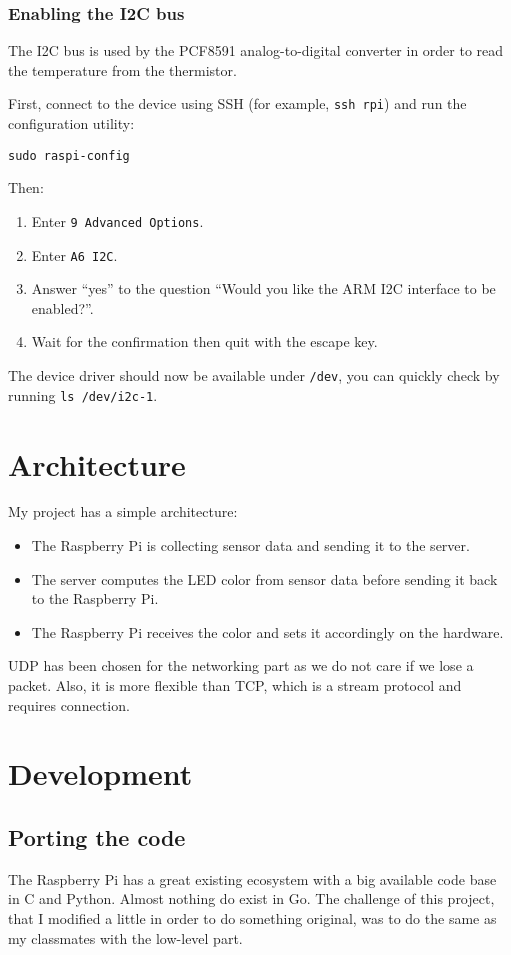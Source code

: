 \documentclass[11pt,a4paper]{article}
\newcommand{\rpi}{Raspberry Pi\xspace}
\begin{document}
\subsubsection{Enabling the I2C bus}
The I2C bus is used by the PCF8591 analog-to-digital converter in order to read the temperature from the thermistor.

First, connect to the device using SSH (for example, \texttt{ssh rpi}) and run the configuration utility:
\begin{verbatim}
sudo raspi-config
\end{verbatim}

Then:
\begin{enumerate}
  \item Enter \texttt{9 Advanced Options}.
  \item Enter \texttt{A6 I2C}.
  \item Answer ``yes'' to the question ``Would you like the ARM I2C interface to be enabled?''.
  \item Wait for the confirmation then quit with the escape key.
\end{enumerate}

The device driver should now be available under \texttt{/dev}, you can quickly check by running \texttt{ls /dev/i2c-1}.

\section{Architecture}
My project has a simple architecture:
\begin{itemize}
    \item   The \rpi is collecting sensor data and sending it to the server.
    \item   The server computes the LED color from sensor data before sending it back to the \rpi.
    \item   The \rpi receives the color and sets it accordingly on the hardware.
\end{itemize}

UDP has been chosen for the networking part as we do not care if we lose a packet. Also, it is more flexible than TCP, which is a stream protocol and requires connection.

\section{Development}

\subsection{Porting the code}
The \rpi has a great existing ecosystem with a big available code base in C and Python. Almost nothing do exist in Go. The challenge of this project, that I modified a little in order to do something original, was to do the same as my classmates with the low-level part.
\end{document}
